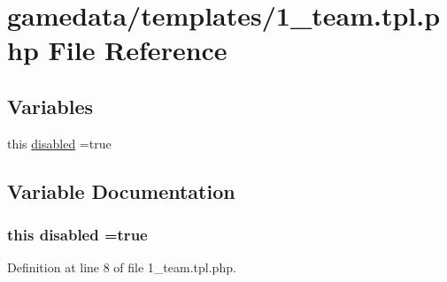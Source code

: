 \hypertarget{1__team_8tpl_8php}{\section{gamedata/templates/1\+\_\+team.tpl.\+php File Reference}
\label{1__team_8tpl_8php}
}
\subsection*{Variables}
\begin{DoxyCompactItemize}
\item 
this \hyperlink{1__team_8tpl_8php_a5954796dd8b0e54067ec29be2f8c5cf3}{disabled} =true
\end{DoxyCompactItemize}


\subsection{Variable Documentation}
\hypertarget{1__team_8tpl_8php_a5954796dd8b0e54067ec29be2f8c5cf3}{
\subsubsection[{disabled}]{\setlength{\rightskip}{0pt plus 5cm}this disabled =true}}\label{1__team_8tpl_8php_a5954796dd8b0e54067ec29be2f8c5cf3}


Definition at line 8 of file 1\+\_\+team.\+tpl.\+php.

